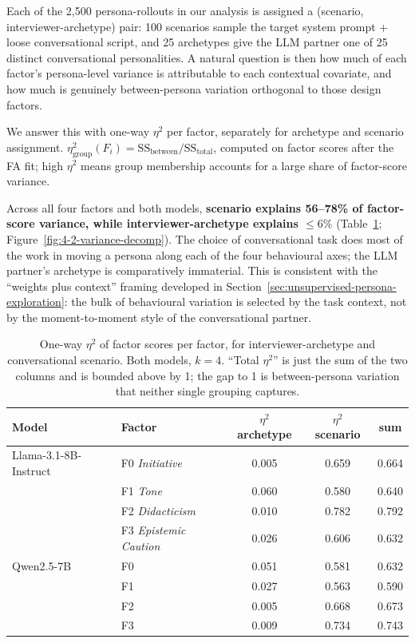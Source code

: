 Each of the 2{,}500 persona-rollouts in our analysis is assigned a (scenario, interviewer-archetype) pair: 100 scenarios sample the target system prompt + loose conversational script, and 25 archetypes give the LLM partner one of 25 distinct conversational personalities.
A natural question is then how much of each factor's persona-level variance is attributable to each contextual covariate, and how much is genuinely between-persona variation orthogonal to those design factors.

We answer this with one-way $\eta^2$ per factor, separately for archetype and scenario assignment.
$\eta^2_{\text{group}}(F_i) = \mathrm{SS}_{\text{between}} / \mathrm{SS}_{\text{total}}$, computed on factor scores after the FA fit; high $\eta^2$ means group membership accounts for a large share of factor-score variance.

Across all four factors and both models, \textbf{scenario explains 56--78\% of factor-score variance, while interviewer-archetype explains $\leq 6\%$} (Table~\ref{tab:4-2-variance-decomp}; Figure~\ref{fig:4-2-variance-decomp}).
The choice of conversational task does most of the work in moving a persona along each of the four behavioural axes; the LLM partner's archetype is comparatively immaterial.
This is consistent with the ``weights plus context'' framing developed in Section~\ref{sec:unsupervised-persona-exploration}: the bulk of behavioural variation is selected by the task context, not by the moment-to-moment style of the conversational partner.

\begin{table}[htbp]
\centering
\caption{One-way $\eta^2$ of factor scores per factor, for interviewer-archetype and conversational scenario. Both models, $k=4$. ``Total $\eta^2$'' is just the sum of the two columns and is bounded above by 1; the gap to 1 is between-persona variation that neither single grouping captures.}
\label{tab:4-2-variance-decomp}
\begin{tabular}{l l c c c}
\toprule
Model & Factor & $\eta^2$ archetype & $\eta^2$ scenario & sum \\
\midrule
Llama-3.1-8B-Instruct  & F0 \textit{Initiative}        & 0.005 & 0.659 & 0.664 \\
              & F1 \textit{Tone}              & 0.060 & 0.580 & 0.640 \\
              & F2 \textit{Didacticism}       & 0.010 & 0.782 & 0.792 \\
              & F3 \textit{Epistemic Caution} & 0.026 & 0.606 & 0.632 \\
\midrule
Qwen2.5-7B    & F0 & 0.051 & 0.581 & 0.632 \\
              & F1 & 0.027 & 0.563 & 0.590 \\
              & F2 & 0.005 & 0.668 & 0.673 \\
              & F3 & 0.009 & 0.734 & 0.743 \\
\bottomrule
\end{tabular}
\end{table}


